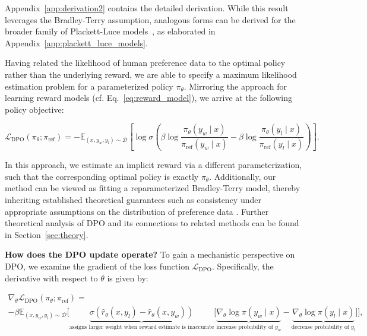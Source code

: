 Appendix~\ref{app:derivation2} contains the detailed derivation. While this result leverages the Bradley-Terry assumption, analogous forms can be derived for the broader family of Plackett-Luce models~\citep{plackett1975analysis, luce2012individual}, as elaborated in Appendix~\ref{app:plackett_luce_models}.

Having related the likelihood of human preference data to the optimal policy rather than the underlying reward, we are able to specify a maximum likelihood estimation problem for a parameterized policy $\pi_\theta$. Mirroring the approach for learning reward models (cf. Eq.~\ref{eq:reward_model}), we arrive at the following policy objective:

\begin{equation}\label{eq:optimum_model}
    \mathcal{L}_\text{DPO}(\pi_{\theta}; \pi_\text{ref}) = -\mathbb{E}_{(x, y_w, y_l)\sim \mathcal{D}}\left[\log \sigma \left(\beta \log \frac{\pi_{\theta}(y_w\mid x)}{\pi_\text{ref}(y_w\mid x)} - \beta \log \frac{\pi_{\theta}(y_l\mid x)}{\pi_\text{ref}(y_l\mid x)}\right)\right].
\end{equation}

In this approach, we estimate an implicit reward via a different parameterization, such that the corresponding optimal policy is exactly $\pi_\theta$. Additionally, our method can be viewed as fitting a reparameterized Bradley-Terry model, thereby inheriting established theoretical guarantees such as consistency under appropriate assumptions on the distribution of preference data \cite{bong2022generalized}. Further theoretical analysis of DPO and its connections to related methods can be found in Section~\ref{sec:theory}.

\textbf{How does the DPO update operate?} To gain a mechanistic perspective on DPO, we examine the gradient of the loss function $\mathcal{L}_\text{DPO}$. Specifically, the derivative with respect to $\theta$ is given by:

\begin{multline*}\label{eq:gradient}
    \nabla_\theta \mathcal{L}_\text{DPO}(\pi_\theta;\pi_\text{ref}) = \\ -\beta\mathbb{E}_{(x, y_w, y_l) \sim \mathcal{D}} \bigg[\underbrace{\sigma(\hat{r}_\theta(x, y_l) - \hat{r}_\theta (x, y_w))}_\text{assigns larger weight when reward estimate is inaccurate}\bigg[\underbrace{\nabla_\theta\log \pi(y_w \mid x)}_\text{increase probability of $y_w$} - \underbrace{\nabla_\theta\log\pi(y_l \mid x)}_\text{decrease probability of $y_l$}\bigg]\bigg],
\end{multline*}

